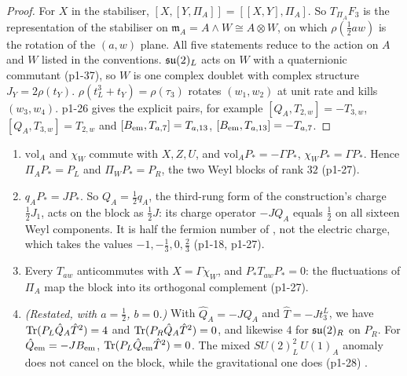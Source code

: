 \begin{proof}
For $X$ in the stabiliser, $[X,[Y,\Pi_A]]=[[X,Y],\Pi_A]$. So $T_{\Pi_A}F_3$ is the representation of the stabiliser on $\mathfrak m_A=A\wedge W\cong A\otimes W$, on which
$\rho(\tfrac12aw)$ is the rotation of the $(a,w)$ plane. All five statements reduce to the action on $A$ and $W$ listed in the conventions. $\mathfrak{su}(2)_L$ acts on $W$ with a
quaternionic commutant (p1-37), so $W$ is one complex doublet with complex structure $J_Y=2\rho(t_Y)$. $\rho(t^3_L+t_Y)=\rho(\tau_3)$ rotates $(w_1,w_2)$ at unit rate and
kills $(w_3,w_4)$. p1-26 gives the explicit pairs, for example $[Q_A,T_{2,w}]=-T_{3,w}$, $[Q_A,T_{3,w}]=T_{2,w}$ and $[B_{\rm em},T_{a,7}]=T_{a,13}$, $[B_{\rm em},T_{a,13}]=-T_{a,7}$.
\end{proof}

\begin{proposition}
\label{p1:prop:block}
\begin{enumerate}[label=(\roman*),leftmargin=2.2em]
\item $\mathrm{vol}_A$ and $\chi_W$ commute with $X,Z,U$, and $\mathrm{vol}_AP_*=-\Gamma P_*$, $\chi_WP_*=\Gamma P_*$. Hence $\Pi_AP_*=P_L$ and $\Pi_WP_*=P_R$, the two Weyl blocks of rank
$32$ (p1-27).
\item $q_AP_*=JP_*$. So $Q_A=\tfrac12q_A$, the third-rung form of the construction's charge $\tfrac12J_1$, acts on the block as $\tfrac12J$: its charge operator
$-JQ_A$ equals $\tfrac12$ on all sixteen Weyl components. It is half the fermion number of \cite[Section~8]{ES17}, not the electric charge, which takes the values
$-1,-\tfrac13,0,\tfrac23$ (p1-18, p1-27).
\item Every $T_{aw}$ anticommutes with $X=\Gamma\chi_W$, and $P_*T_{aw}P_*=0$: the fluctuations of $\Pi_A$ map the block into its orthogonal complement (p1-27).
\item \emph{(Restated, \cite[Prop.~8.5]{ES17} with $a=\tfrac12$, $b=0$.)} With $\hat Q_A=-JQ_A$ and $\hat T=-Jt^L_3$, we have $\operatorname{Tr}(P_L\hat Q_A\hat T^2)=4$ and
$\operatorname{Tr}(P_R\hat Q_A\hat T^2)=0$, and likewise $4$ for $\mathfrak{su}(2)_R$ on $P_R$. For $\hat Q_{\rm em}=-JB_{\rm em}$, $\operatorname{Tr}(P_L\hat Q_{\rm em}\hat T^2)=0$. The mixed $SU(2)_L^2\,U(1)_A$ anomaly does
not cancel on the block, while the gravitational one does (p1-28) \cite{BouchiatIliopoulosMeyer72,GeorgiGlashow72}.
\end{enumerate}
\end{proposition}

